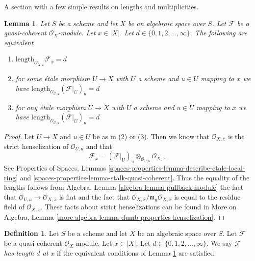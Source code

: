 \documentclass{stacks-project}
\theoremstyle{plain}
\newtheorem{lemma}[subsection]{Lemma}
\theoremstyle{definition}
\newtheorem{definition}[subsection]{Definition}
\theoremstyle{remark}
\numberwithin{equation}{subsection}
\begin{document}
\noindent
A section with a few simple results on lengths and multiplicities.

\begin{lemma}
\label{lemma-length}
Let $S$ be a scheme and let $X$ be an algebraic space over $S$.
Let $\mathcal{F}$ be a quasi-coherent $\mathcal{O}_X$-module.
Let $x \in |X|$. Let $d \in \{0, 1, 2, \ldots, \infty\}$.
The following are equivalent
\begin{enumerate}
\item
$\text{length}_{\mathcal{O}_{X, \overline{x}}} \mathcal{F}_{\overline{x}} = d$
\item for some \'etale morphism $U \to X$ with $U$ a scheme
and $u \in U$ mapping to $x$ we have
$\text{length}_{\mathcal{O}_{U, u}} (\mathcal{F}|_U)_u = d$
\item for any \'etale morphism $U \to X$ with $U$ a scheme
and $u \in U$ mapping to $x$ we have
$\text{length}_{\mathcal{O}_{U, u}} (\mathcal{F}|_U)_u = d$
\end{enumerate}
\end{lemma}

\begin{proof}
Let $U \to X$ and $u \in U$ be as in (2) or (3). Then we know that
$\mathcal{O}_{X, \overline{x}}$ is the strict henselization of
$\mathcal{O}_{U, u}$ and that
$$
\mathcal{F}_{\overline{x}} =
(\mathcal{F}|_U)_u \otimes_{\mathcal{O}_{U, u}} \mathcal{O}_{X, \overline{x}}
$$
See Properties of Spaces,
Lemmas \ref{spaces-properties-lemma-describe-etale-local-ring} and
\ref{spaces-properties-lemma-stalk-quasi-coherent}.
Thus the equality of the lengths follows from
Algebra, Lemma \ref{algebra-lemma-pullback-module}
the fact that $\mathcal{O}_{U, u} \to \mathcal{O}_{X, \overline{x}}$
is flat and the fact that
$\mathcal{O}_{X, \overline{x}}/\mathfrak m_u\mathcal{O}_{X, \overline{x}}$
is equal to the residue field of $\mathcal{O}_{X, \overline{x}}$.
These facts about strict henselizations can be found in
More on Algebra, Lemma \ref{more-algebra-lemma-dumb-properties-henselization}.
\end{proof}

\begin{definition}
\label{definition-length-at-x}
Let $S$ be a scheme and let $X$ be an algebraic space over $S$.
Let $\mathcal{F}$ be a quasi-coherent $\mathcal{O}_X$-module.
Let $x \in |X|$. Let $d \in \{0, 1, 2, \ldots, \infty\}$.
We say {\it $\mathcal{F}$ has length $d$ at $x$}
if the equivalent conditions of Lemma \ref{lemma-length}
are satisfied.
\end{definition}
\end{document}
